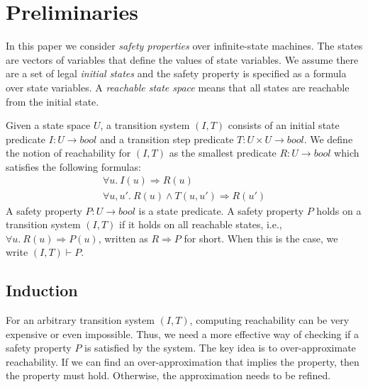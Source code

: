 \section{Preliminaries}
\label{sec:prelim}
\newcommand{\bool}[0]{\mathit{bool}}
\newcommand{\reach}[0]{\mathit{R}}
\newcommand{\ite}[3]{\mathit{if}\ {#1}\ \mathit{then}\ {#2}\ \mathit{else}\ {#3}}

In this paper we consider \emph{safety properties} over infinite-state machines. The states are vectors of variables that define the values of state variables. We assume there are a set of legal \emph{initial states} and the safety property is specified as a formula over state variables. A \emph{reachable state space} means that all states are reachable from the initial state. 

Given a state space $U$, a transition system $(I,T)$ consists of an
initial state predicate $I : U \to \bool$ and a transition step
predicate $T : U \times U \to \bool$.
We define the notion of
reachability for $(I, T)$ as the smallest predicate $\reach : U \to
\bool$ which satisfies the following formulas:
\begin{gather*}
  \forall u.~ I(u) \Rightarrow \reach(u) \\
  \forall u, u'.~ \reach(u) \land T(u, u') \Rightarrow \reach(u')
\end{gather*}
A safety property $P : U \to \bool$ is a state predicate. A safety
property $P$ holds on a transition system $(I, T)$ if it holds on all
reachable states, i.e., $\forall u.~ \reach(u) \Rightarrow P(u)$,
written as $\reach \Rightarrow P$ for short. When this is the case, we
write $(I, T)\vdash P$.

\subsection{Induction}
For an arbitrary transition system $(I, T)$, computing reachability
can be very expensive or even impossible. Thus, we need a more
effective way of checking if a safety property $P$ is satisfied by the
system. The key idea is to over-approximate reachability. If we can
find an over-approximation that implies the property, then the
property must hold. Otherwise, the approximation needs to be refined.

